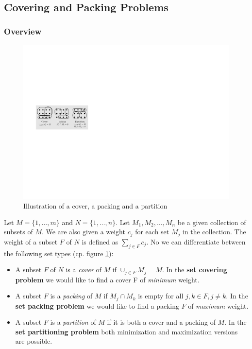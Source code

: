 \subsection{Covering and Packing Problems}
\subsubsection{Overview}
\begin{figure}[htbp]
\begin{center}
\includegraphics{images/coverpackingpartition}
\caption{Illustration of a cover, a packing and a partition}
\label{fig:coverpackingpartition}
\end{center}
\end{figure}

Let $M = \{1, \ldots, m\}$ and $N=\{1, \ldots, n\}$. Let $M_1, M_2, \ldots, M_n$ be a given collection of subsets of $M$. We are also given a weight $c_j$ for each set $M_j$ in the collection. The weight of a subset $F$ of $N$ is defined as $\sum_{j \in F}c_j$. No we can differentiate between the following set types (cp. figure \ref{fig:coverpackingpartition}):

\begin{itemize}
	\item{A subset $F$ of $N$ is a \emph{cover} of $M$ if $\cup_{j \in F}M_j = M$. In the \textbf{set covering problem} we would like to find a cover F of \emph{minimum} weight.}
	\item{A subset $F$ is a \emph{packing} of $M$ if $M_j \cap M_k$ is empty for all $j,k \in F, j \neq k$. In the \textbf{set packing problem} we would like to find a packing $F$ of \emph{maximum} weight.}
	\item{A subset $F$ is a \emph{partition} of $M$ if it is both a cover and a packing of $M$. In the \textbf{set partitioning problem} both minimization and maximization versions are possible.}
\end{itemize}

